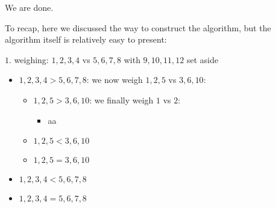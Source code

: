 \begin{problem}
We are done. 

To recap, here we discussed the way to construct the algorithm, but the algorithm itself is relatively easy to present:

$1.$ weighing: $1,2,3,4$ vs $5,6,7,8$ with $9,10,11,12$ set aside 
\begin{itemize}
\item $1,2,3,4 > 5,6,7,8$: we now weigh $1,2,5$ vs $3,6,10$:
	\begin{itemize}
		\item $1,2,5 > 3,6,10$: we finally weigh $1$ vs $2$:
			\begin{itemize}
				\item aa
			\end{itemize}
		\item $1,2,5 < 3,6,10$
		\item $1,2,5 = 3,6,10$
	\end{itemize} 
\item $1,2,3,4 < 5,6,7,8$ 
\item $1,2,3,4 = 5,6,7,8$ 
\end{itemize}

\end{problem}
%


